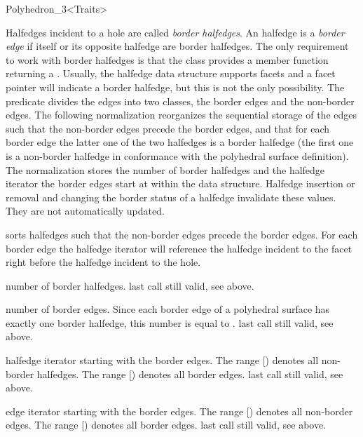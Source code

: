 \begin{ccRefClass}{Polyhedron_3<Traits>}
\begin{ccAdvanced}
Halfedges incident to a hole are called {\em border halfedges}. An
halfedge is a {\em border edge\/} if itself or its opposite halfedge
are border halfedges. The only requirement to work with border
halfedges is that the  class provides a member function
 returning a . Usually, the halfedge data
structure supports facets and a  facet pointer will indicate
a border halfedge, but this is not the only possibility. The
 predicate divides the edges into two classes, the
border edges and the non-border edges. The following normalization
reorganizes the sequential storage of the edges such that the
non-border edges precede the border edges, and that for each border
edge the latter one of the two halfedges is a border halfedge (the
first one is a non-border halfedge in conformance with the polyhedral
surface definition). The normalization stores the number of border
halfedges and the halfedge iterator the border edges start at within
the data structure.  Halfedge insertion or removal and changing the
border status of a halfedge invalidate these values. They are not
automatically updated.


    {sorts halfedges such that the non-border edges precede the
     border edges. For each border edge the halfedge iterator will
    reference the halfedge incident to the facet right before the
    halfedge incident to the hole.} 

    {number of border halfedges.
    \ccPrecond last  call still valid, see above.}

    {number of border edges. Since each border edge of a polyhedral
    surface has exactly one border halfedge,
    this number is equal to .
    \ccPrecond last  call still valid, see above.}

    {halfedge iterator starting with the border edges. The range
      [) denotes
    all non-border halfedges. The range
    [) denotes all
    border edges.
    \ccPrecond last  call still valid, see above.}

    {edge iterator starting with the border edges. The range
      [) denotes
    all non-border edges. The range
    [) denotes all
    border edges.
    \ccPrecond last  call still valid, see above.}


\end{ccAdvanced}
\end{ccRefClass}
